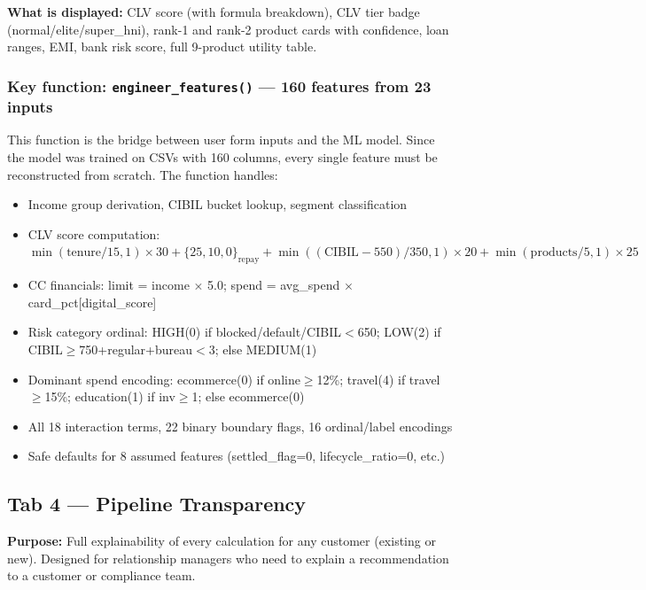 \documentclass[12pt,a4paper]{article}
\begin{document}
\textbf{What is displayed:} CLV score (with formula breakdown), CLV tier badge (normal/elite/super\_hni), rank-1 and rank-2 product cards with confidence, loan ranges, EMI, bank risk score, full 9-product utility table.

\subsubsection*{Key function: \texttt{engineer\_features()} — 160 features from 23 inputs}

This function is the bridge between user form inputs and the ML model. Since the model was trained on CSVs with 160 columns, every single feature must be reconstructed from scratch. The function handles:

\begin{itemize}[leftmargin=*,itemsep=2pt]
  \item Income group derivation, CIBIL bucket lookup, segment classification
  \item CLV score computation: $\min(\text{tenure}/15,1)\times30 + \{25,10,0\}_\text{repay} + \min((\text{CIBIL}-550)/350,1)\times20 + \min(\text{products}/5,1)\times25$
  \item CC financials: limit = income $\times$ 5.0; spend = avg\_spend $\times$ card\_pct[digital\_score]
  \item Risk category ordinal: HIGH(0) if blocked/default/CIBIL$<$650; LOW(2) if CIBIL$\geq$750+regular+bureau$<$3; else MEDIUM(1)
  \item Dominant spend encoding: ecommerce(0) if online$\geq$12\%; travel(4) if travel$\geq$15\%; education(1) if inv$\geq$1; else ecommerce(0)
  \item All 18 interaction terms, 22 binary boundary flags, 16 ordinal/label encodings
  \item Safe defaults for 8 assumed features (settled\_flag=0, lifecycle\_ratio=0, etc.)
\end{itemize}

\subsection{Tab 4 — Pipeline Transparency}

\textbf{Purpose:} Full explainability of every calculation for any customer (existing or new). Designed for relationship managers who need to explain a recommendation to a customer or compliance team.
\end{document}
